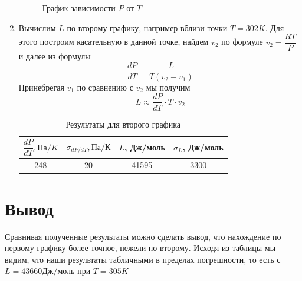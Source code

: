 \documentclass[a4paper, 12pt]{article}%
\begin{document}
\begin{enumerate}
\begin{figure}[h]
\caption{График зависимости $P$ от $T$}
\end{figure} 
\item Вычислим $L$ по второму графику, например вблизи точки $T = 302K$. Для этого построим касательную в данной точке, найдем $v_2$ по формуле $v_2 = \dfrac{RT}{P}$ и далее из формулы 
\[\dfrac{dP}{dT} = \dfrac{L}{T(v_2 - v_1)}\]
Принебрегая $v_1$ по сравнению с $v_2$ мы получим 
\[L \approx \dfrac{dP}{dT} \cdot T \cdot v_2\]
\begin{table}[h]
\begin{tabular}{|c|c|c|c|}
\hline
$\dfrac{dP}{dT},\text{Па}/K$ & $\sigma_{dP/dT}, Па/К$ & $L$, Дж/моль & $\sigma_L$, Дж/моль \\ \hline
248 & 20 & 41595 & 3300 \\ \hline
\end{tabular}
\caption{Результаты для второго графика}
\end{table}
\end{enumerate}
\section*{Вывод}
Сравнивая полученные результаты можно сделать вывод, что нахождение по первому графику более точное, нежели по второму. Исходя из таблицы мы видим, что наши результаты табличными в пределах погрешности, то есть с $L = 43660 \text{Дж}/\text{моль}$ при $T = 305 K$
\end{document}
